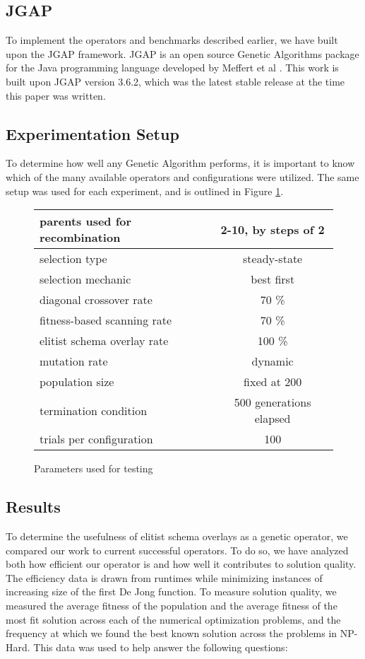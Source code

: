 \subsection*{JGAP}
To implement the operators and benchmarks described earlier, we have built upon the JGAP framework. JGAP is an open source Genetic Algorithms package for the Java programming language developed by Meffert et al \cite{jgap}. This work is built upon JGAP version 3.6.2, which was the latest stable release at the time this paper was written.

\subsection*{Experimentation Setup}

To determine how well any Genetic Algorithm performs, it is important to know which of the many available operators and configurations were utilized. The same setup was used for each experiment, and is outlined in Figure \ref{GA-config}. 

\begin{figure}[h]
\begin{center}
\begin{tabular}{ | l | c | }
\hline
parents used for recombination & 2-10, by steps of 2 \\
\hline
selection type & steady-state \\
\hline
selection mechanic & best first \\
\hline
diagonal crossover rate & 70 \% \\
\hline
fitness-based scanning rate & 70 \% \\
\hline
elitist schema overlay rate & 100 \% \\
\hline
mutation rate & dynamic \cite{Back93} \\
\hline
population size & fixed at 200 \\
\hline
termination condition & 500 generations elapsed \\
\hline
trials per configuration & 100 \\
\hline
\end{tabular}
\caption{Parameters used for testing}
\end{center}
\label{GA-config}
\end{figure}


\subsection*{Results}
To determine the usefulness of elitist schema overlays as a genetic operator, we compared our work to current successful operators. To do so, we have analyzed both how efficient our operator is and how well it contributes to solution quality. The efficiency data is drawn from runtimes while minimizing instances of increasing size of the first De Jong function. To measure solution quality, we measured the average fitness of the population and the average fitness of the most fit solution across each of the numerical optimization problems, and the frequency at which we found the best known solution across the problems in NP-Hard. This data was used to help answer the following questions:

